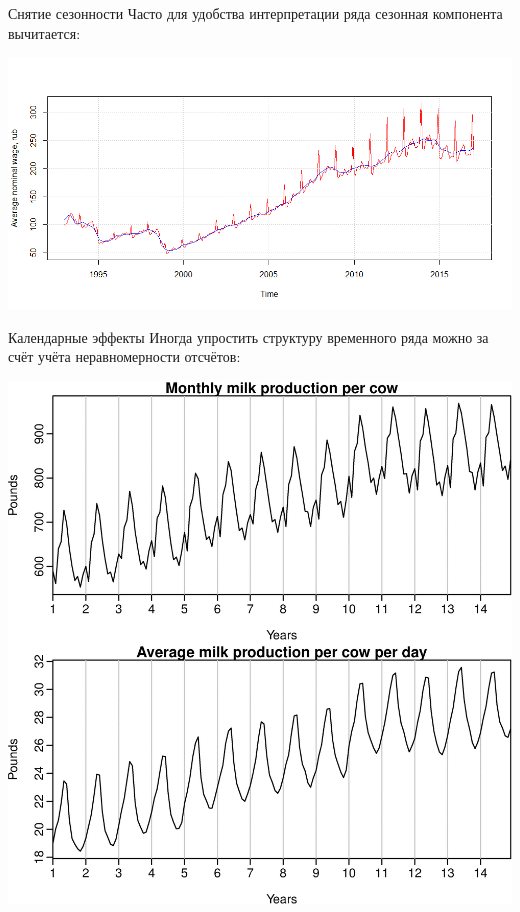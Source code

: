\documentclass[9pt,pdf,utf8,hyperref={unicode},aspectratio=169]{beamer}
\begin{document}
\begin{frame}{Снятие сезонности}
	Часто для удобства интерпретации ряда сезонная компонента вычитается:	
	\begin{center}
		\includegraphics[width=.8\textwidth]{wageseas.png}
	\end{center}	
\end{frame}

\begin{frame}{Календарные эффекты}
	Иногда упростить структуру временного ряда можно за счёт учёта неравномерности отсчётов:
	
	\begin{center}
		\includegraphics[height=0.6\textheight]{milk.png}
	\end{center}
\end{frame}
\end{document}
